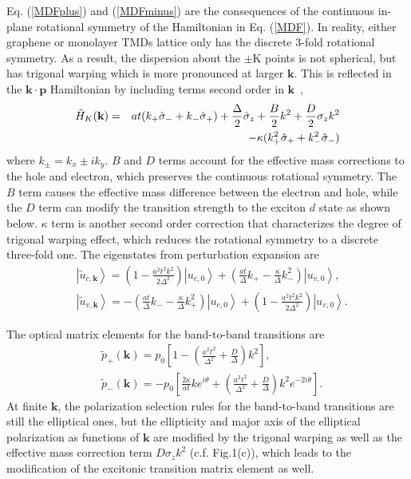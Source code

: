 \documentclass[prb,twocolumn,amsmath,amssymb,superscriptaddress,showpacs]{revtex4}
\begin{document}
Eq. (\ref{MDFplus}) and (\ref{MDFminus}) are the consequences of the continuous in-plane rotational symmetry of the Hamiltonian in Eq. (\ref{MDF}). In reality, either graphene or monolayer TMDs lattice only has the discrete 3-fold rotational symmetry. As a result, the dispersion about the $\pm$K points is not spherical, but has trigonal warping which is more pronounced at larger $\mathbf k$. This is reflected in the $\mathbf k\cdot\mathbf p$ Hamiltonian by including terms second order in $\mathbf{k}$~\cite{Fal'ko TW 2-band 2013},
\begin{eqnarray}
\tilde{H}_{K}(\mathbf{k})&=& at( k_+\hat{\sigma}_- + k_-\hat{\sigma}_+) + \frac{\Delta}{2} \hat{\sigma}_z + \frac{B}{2} k^2 + \frac{D}{2} \sigma_z k^2  \notag \\
&& - \kappa ( k_+^2 \hat{\sigma}_+ + k_-^2 \hat{\sigma}_-)  \label{2band TW H}
 \end{eqnarray}
where $k_{\pm}=k_{x}\pm i k_{y}$. $B$ and $D$ terms account for the effective mass corrections to the hole and electron, which preserves the continuous rotational symmetry. The $B$ term causes the effective mass difference between the electron and hole, while the $D$ term can modify the transition strength to the exciton $d$ state as shown below. $\kappa$ term is another second order correction that characterizes the degree of trigonal warping effect, which reduces the rotational symmetry to a discrete three-fold one. The eigenstates from perturbation expansion are
\begin{subequations}\label{TWeigenstates}
\begin{align}
&\left|\tilde{u}_{c,\mathbf{k}}\right\rangle =\left(1-\frac{a^{2}t^{2}k^{2}}{2\Delta^{2}}\right)\left|u_{c,0}\right\rangle +\left(\frac{at}{\Delta}k_{+}-\frac{\kappa}{\Delta}k_{-}^{2}\right)\left|u_{v,0}\right\rangle, \label{TWcstate} \\
&\left|\tilde{u}_{v,\mathbf{k}}\right\rangle =-\left(\frac{at}{\Delta}k_{-}-\frac{\kappa}{\Delta}k_{+}^{2}\right)\left|u_{c,0}\right\rangle +\left(1-\frac{a^{2}t^{2}k^{2}}{2\Delta^{2}}\right)\left|u_{v,0}\right\rangle. \label{TWvstate}
\end{align}
\end{subequations}

The optical matrix elements for the band-to-band transitions are
\begin{subequations}\label{pTW}
\begin{align}
&\tilde{p}_{+}(\mathbf{k})=
p_0\left[1-(\frac{a^{2}t^{2}}{\Delta^{2}}+\frac{D}{\Delta})k^{2}\right],
\label{PplusTW}\\
&\tilde{p}_{-}(\mathbf{k})= -p_0\left[\frac{2\kappa}{at}ke^{i\theta}+(\frac{a^{2}t^{2}}{\Delta^{2}}+\frac{D}{\Delta})k^{2}e^{-2i\theta}\right].
\label{PminusTW}
\end{align}
\end{subequations}
At finite $\mathbf k$, the polarization selection rules for the band-to-band transitions are still the elliptical ones, but the ellipticity and major axis of the elliptical polarization as functions of $\mathbf k$ are modified by the trigonal warping as well as the effective mass correction term $D \sigma_z k^2$ (c.f. Fig.1(c)), which leads to the modification of the excitonic transition matrix element as well.
\end{document}
